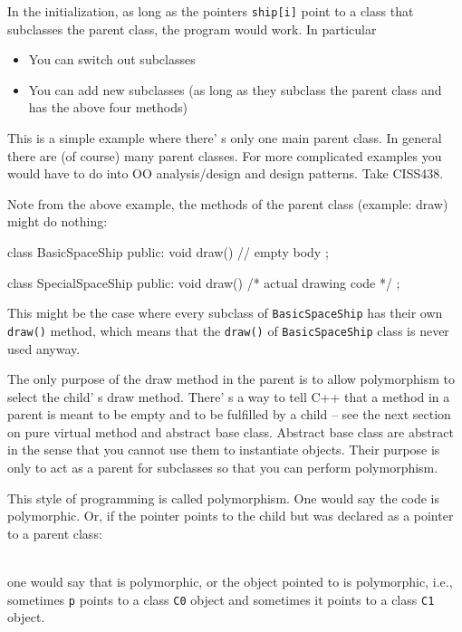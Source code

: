 In the initialization, as long as the pointers \texttt{ship[i]} point to a class that subclasses the parent class, the program would work. In particular

\begin{itemize}
\item
  You can switch out subclasses
\item
  You can add new subclasses (as long as they subclass the parent class and has the above four methods)
\end{itemize}

This is a simple example where there' s only one main
parent class. In general there are (of course) many parent classes. For more complicated examples you would have to do into OO analysis/design and design patterns. Take CISS438.

Note from the above example, the methods of the parent class (example: draw) might do nothing:

\begin{console}
class BasicSpaceShip
{
public:
     void draw() {} // empty body
};

class SpecialSpaceShip
{
public:
     void draw() { /* actual drawing code */ }
};
\end{console}

This might be the case where every subclass of \verb!BasicSpaceShip! has their own \verb!draw()! method, which means that the \verb!draw()! of \verb!BasicSpaceShip! class is never used anyway.

The only purpose of the draw method in the parent is to allow polymorphism to select the child' s draw method. There' s a way to tell C++ that a method in a parent is meant to be empty and to be fulfilled by a child -- see the next section on pure virtual method and abstract base class. Abstract base class are abstract in the sense that you cannot use them to instantiate objects. Their purpose is only to act as a parent for subclasses so that you can perform polymorphism.

This style of programming is called polymorphism. One would say the code is polymorphic. Or, if the pointer points to the child but was declared as a pointer to a parent class:

\\

one would say that is polymorphic, or the object pointed to is polymorphic, i.e., sometimes \texttt{p} points to a class \texttt{C0} object and sometimes it points to a class \texttt{C1} object.

